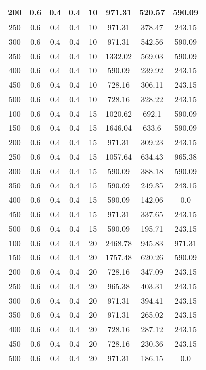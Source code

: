 \documentclass[a4paper, 12pt]{extreport}
\begin{document}
\begin{itemize}
\begin{longtable}{|c|c|c|c|c|c|c|c|}
			200 & 0.6 & 0.4 & 0.4 & 10 & 971.31 & 520.57 & 590.09 \\\hline
			250 & 0.6 & 0.4 & 0.4 & 10 & 971.31 & 378.47 & 243.15 \\\hline
			300 & 0.6 & 0.4 & 0.4 & 10 & 971.31 & 542.56 & 590.09 \\\hline
			350 & 0.6 & 0.4 & 0.4 & 10 & 1332.02 & 569.03 & 590.09 \\\hline
			400 & 0.6 & 0.4 & 0.4 & 10 & 590.09 & 239.92 & 243.15 \\\hline
			450 & 0.6 & 0.4 & 0.4 & 10 & 728.16 & 306.11 & 243.15 \\\hline
			500 & 0.6 & 0.4 & 0.4 & 10 & 728.16 & 328.22 & 243.15 \\\hline
			100 & 0.6 & 0.4 & 0.4 & 15 & 1020.62 & 692.1 & 590.09 \\\hline
			150 & 0.6 & 0.4 & 0.4 & 15 & 1646.04 & 633.6 & 590.09 \\\hline
			200 & 0.6 & 0.4 & 0.4 & 15 & 971.31 & 309.23 & 243.15 \\\hline
			250 & 0.6 & 0.4 & 0.4 & 15 & 1057.64 & 634.43 & 965.38 \\\hline
			300 & 0.6 & 0.4 & 0.4 & 15 & 590.09 & 388.18 & 590.09 \\\hline
			350 & 0.6 & 0.4 & 0.4 & 15 & 590.09 & 249.35 & 243.15 \\\hline
			400 & 0.6 & 0.4 & 0.4 & 15 & 590.09 & 142.06 & 0.0 \\\hline
			450 & 0.6 & 0.4 & 0.4 & 15 & 971.31 & 337.65 & 243.15 \\\hline
			500 & 0.6 & 0.4 & 0.4 & 15 & 590.09 & 195.71 & 243.15 \\\hline
			100 & 0.6 & 0.4 & 0.4 & 20 & 2468.78 & 945.83 & 971.31 \\\hline
			150 & 0.6 & 0.4 & 0.4 & 20 & 1757.48 & 620.26 & 590.09 \\\hline
			200 & 0.6 & 0.4 & 0.4 & 20 & 728.16 & 347.09 & 243.15 \\\hline
			250 & 0.6 & 0.4 & 0.4 & 20 & 965.38 & 403.31 & 243.15 \\\hline
			300 & 0.6 & 0.4 & 0.4 & 20 & 971.31 & 394.41 & 243.15 \\\hline
			350 & 0.6 & 0.4 & 0.4 & 20 & 971.31 & 265.02 & 243.15 \\\hline
			400 & 0.6 & 0.4 & 0.4 & 20 & 728.16 & 287.12 & 243.15 \\\hline
			450 & 0.6 & 0.4 & 0.4 & 20 & 728.16 & 230.36 & 243.15 \\\hline
			500 & 0.6 & 0.4 & 0.4 & 20 & 971.31 & 186.15 & 0.0 \\\hline

\end{longtable}
\end{itemize}
\end{document}
